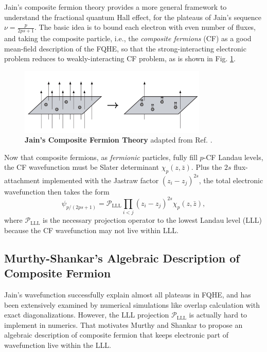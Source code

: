 Jain's composite fermion theory \cite{jain1989composite,jain1989incompressible,jain1990theory} provides a more general framework to understand the fractional quantum Hall effect, for the plateaus of Jain's sequence $\nu=\frac{p}{2ps+1}$. The basic idea is to bound each electron with even number of fluxes, and taking the composite particle, i.e., the \emph{composite fermions} (CF) as a good mean-field description of the FQHE, so that the strong-interacting electronic problem reduces to weakly-interacting CF problem, as is shown in Fig. \ref{fig:Jain_CF}.
\begin{figure}[!htp]
    \centering
    \includegraphics[width=0.8\textwidth]{figures/Background/Jain_CF.png}
    \caption{\textbf{Jain's Composite Fermion Theory} adapted from Ref. \cite{jain2007composite}.}
    \label{fig:Jain_CF}
\end{figure}
Now that composite fermions, as \emph{fermionic} particles, fully fill $p$-CF Landau levels, the CF wavefunction must be Slater determinant $\chi_p(z,\bar z)$. Plus the $2s$ flux-attachment implemented with the Jastraw factor $(z_i-z_j)^{2s}$, the total electronic wavefunction then takes the form
\begin{equation*}
    \psi_{p/(2ps+1)}=\mathcal P_{\text{LLL}}\prod_{i<j}(z_i-z_j)^{2s}\chi_p(z,\bar z),
\end{equation*}
where $\mathcal P_{\text{LLL}}$ is the necessary projection operator to the lowest Landau level (LLL) because the CF wavefunction may not live within LLL.

\subsection{Murthy-Shankar's Algebraic Description of Composite Fermion}
Jain's wavefunction successfully explain almost all plateaus in FQHE, and has been extensively examined by numerical simulations like overlap calculation with exact diagonalizations. However, the LLL projection $\mathcal P_{\text{LLL}}$ is actually hard to implement in numerics. That motivates Murthy and Shankar to propose an algebraic description of composite fermion \cite{murthy1999hamiltonian} that keeps electronic part of wavefunction live within the LLL.

